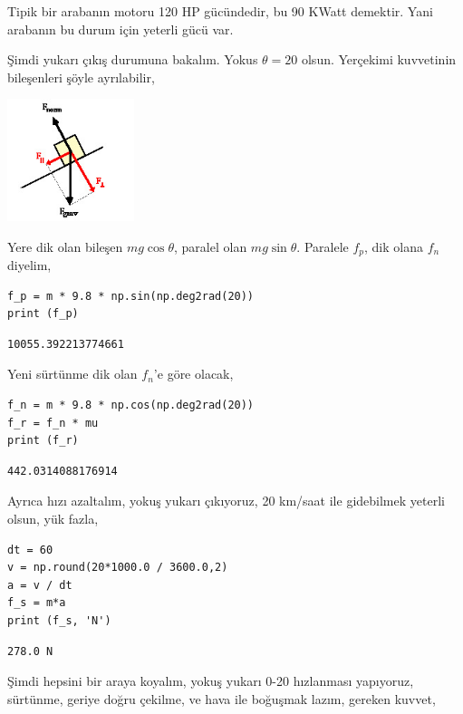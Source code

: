\documentclass[12pt,fleqn]{article}\usepackage{../../common}
\begin{document}
Tipik bir arabanın motoru 120 HP gücündedir, bu 90 KWatt demektir. Yani arabanın
bu durum için yeterli gücü var.

Şimdi yukarı çıkış durumuna bakalım. Yokus $\theta = 20$ olsun. Yerçekimi
kuvvetinin bileşenleri şöyle ayrılabilir,

\includegraphics[width=10em]{phy_005_basics_01_08.jpg}

Yere dik olan bileşen $m g \cos\theta$, paralel olan $m g \sin\theta$. Paralele
$f_p$, dik olana $f_n$ diyelim,

\begin{verbatim}  
f_p = m * 9.8 * np.sin(np.deg2rad(20))
print (f_p)
\end{verbatim}

\begin{verbatim}
10055.392213774661
\end{verbatim}

Yeni sürtünme dik olan $f_n$'e göre olacak,

\begin{verbatim}
f_n = m * 9.8 * np.cos(np.deg2rad(20))
f_r = f_n * mu
print (f_r)
\end{verbatim}

\begin{verbatim}
442.0314088176914
\end{verbatim}

Ayrıca hızı azaltalım, yokuş yukarı çıkıyoruz, 20 km/saat ile gidebilmek yeterli
olsun, yük fazla,

\begin{verbatim}
dt = 60
v = np.round(20*1000.0 / 3600.0,2)
a = v / dt
f_s = m*a
print (f_s, 'N')
\end{verbatim}

\begin{verbatim}
278.0 N
\end{verbatim}

Şimdi hepsini bir araya koyalım, yokuş yukarı 0-20 hızlanması yapıyoruz,
sürtünme, geriye doğru çekilme, ve hava ile boğuşmak lazım, gereken kuvvet,
\end{document}
